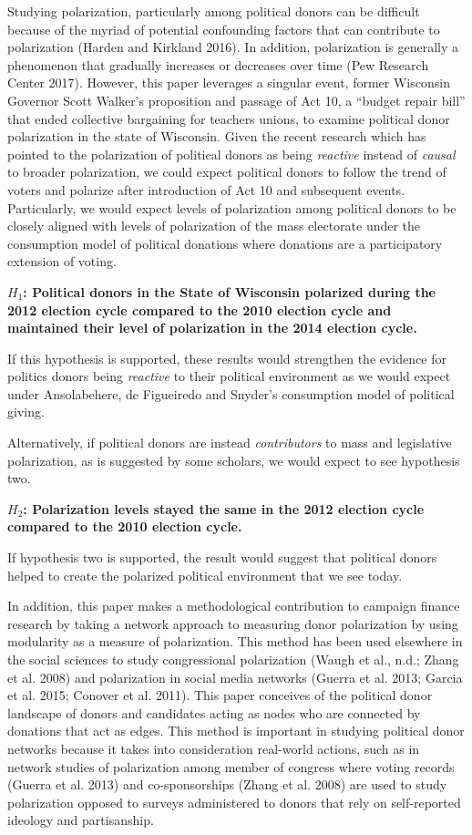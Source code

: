 \documentclass[12pt,]{article}
\begin{document}
Studying polarization, particularly among political donors can be
difficult because of the myriad of potential confounding factors that
can contribute to polarization (Harden and Kirkland 2016). In addition,
polarization is generally a phenomenon that gradually increases or
decreases over time (Pew Research Center 2017). However, this paper
leverages a singular event, former Wisconsin Governor Scott Walker's
proposition and passage of Act 10, a ``budget repair bill'' that ended
collective bargaining for teachers unions, to examine political donor
polarization in the state of Wisconsin. Given the recent research which
has pointed to the polarization of political donors as being
\emph{reactive} instead of \emph{causal} to broader polarization, we
could expect political donors to follow the trend of voters and polarize
after introduction of Act 10 and subsequent events. Particularly, we
would expect levels of polarization among political donors to be closely
aligned with levels of polarization of the mass electorate under the
consumption model of political donations where donations are a
participatory extension of voting.

\textbf{\(H_{1}\): Political donors in the State of Wisconsin polarized
during the 2012 election cycle compared to the 2010 election cycle and
maintained their level of polarization in the 2014 election cycle.}

If this hypothesis is supported, these results would strengthen the
evidence for politics donors being \emph{reactive} to their political
environment as we would expect under Ansolabehere, de Figueiredo and
Snyder's consumption model of political giving.

Alternatively, if political donors are instead \emph{contributors} to
mass and legislative polarization, as is suggested by some scholars, we
would expect to see hypothesis two.

\textbf{\(H_{2}\): Polarization levels stayed the same in the 2012
election cycle compared to the 2010 election cycle.}

If hypothesis two is supported, the result would suggest that political
donors helped to create the polarized political environment that we see
today.

In addition, this paper makes a methodological contribution to campaign
finance research by taking a network approach to measuring donor
polarization by using modularity as a measure of polarization. This
method has been used elsewhere in the social sciences to study
congressional polarization (Waugh et al., n.d.; Zhang et al. 2008) and
polarization in social media networks (Guerra et al. 2013; Garcia et al.
2015; Conover et al. 2011). This paper conceives of the political donor
landscape of donors and candidates acting as nodes who are connected by
donations that act as edges. This method is important in studying
political donor networks because it takes into consideration real-world
actions, such as in network studies of polarization among member of
congress where voting records (Guerra et al. 2013) and co-sponsorships
(Zhang et al. 2008) are used to study polarization opposed to surveys
administered to donors that rely on self-reported ideology and
partisanship.
\end{document}
